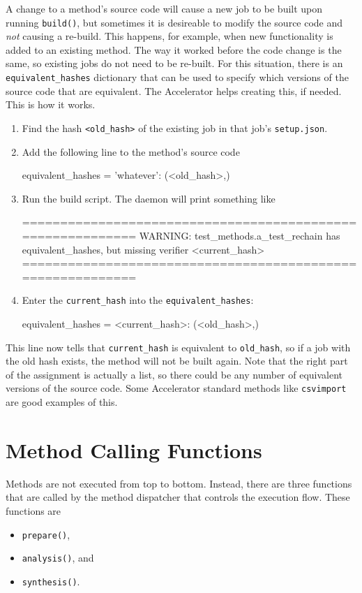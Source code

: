 A change to a method's source code will cause a new job to be built
upon running \texttt{build()}, but sometimes it is
desireable to modify the source code and \textsl{not} causing a
re-build.  This happens, for example, when new functionality is added
to an existing method.  The way it worked before the code change is
the same, so existing jobs do not need to be re-built.  For this
situation, there is an \texttt{equivalent\_hashes} dictionary that can
be used to specify which versions of the source code that are
equivalent.  The Accelerator helps creating this, if needed.  This is
how it works.
\begin{enumerate}
\item Find the hash \texttt{<old\_hash>} of the existing job in that job's \texttt{setup.json}.
\item Add the following line to the method's source code
\begin{python}
equivalent_hashes = {'whatever': (<old_hash>,)}
\end{python}
\item Run the build script.  The daemon will print something like
\begin{shell}
===========================================================
WARNING: test_methods.a_test_rechain has equivalent_hashes,
but missing verifier <current_hash>
===========================================================
\end{shell}
\item Enter the \texttt{current\_hash} into the \texttt{equivalent\_hashes}:
\begin{python}
equivalent_hashes = {<current_hash>: (<old_hash>,)}
\end{python}
\end{enumerate}
This line now tells that \texttt{current\_hash} is equivalent
to \texttt{old\_hash}, so if a job with the old hash exists, the
method will not be built again.  Note that the right part of the
assignment is actually a list, so there could be any number of
equivalent versions of the source code.  Some Accelerator standard
methods like \texttt{csvimport} are good examples of this.



\section{Method Calling Functions}

Methods are not executed from top to bottom.  Instead, there are three
functions that are called by the method dispatcher that controls the
execution flow.  These functions are
\begin{itemize}
\item [] \texttt{prepare()},
\item [] \texttt{analysis()}, and
\item [] \texttt{synthesis()}.
\end{itemize}



